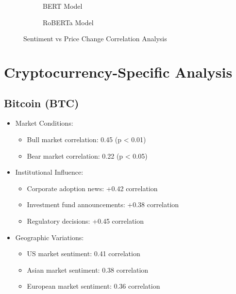 \documentclass[12pt,a4paper]{report}
\begin{document}
\begin{figure}[H]
    \centering
    \begin{subfigure}[b]{0.48\textwidth}
        
        \caption{BERT Model}
    \end{subfigure}
    \hfill
    \begin{subfigure}[b]{0.48\textwidth}
        
        \caption{RoBERTa Model}
    \end{subfigure}
    \caption{Sentiment vs Price Change Correlation Analysis}
\end{figure}

\section{Cryptocurrency-Specific Analysis}
\subsection{Bitcoin (BTC)}
\begin{itemize}
    \item Market Conditions:
        \begin{itemize}
            \item Bull market correlation: 0.45 (p < 0.01)
            \item Bear market correlation: 0.22 (p < 0.05)
        \end{itemize}
    \item Institutional Influence:
        \begin{itemize}
            \item Corporate adoption news: +0.42 correlation
            \item Investment fund announcements: +0.38 correlation
            \item Regulatory decisions: +0.45 correlation
        \end{itemize}
    \item Geographic Variations:
        \begin{itemize}
            \item US market sentiment: 0.41 correlation
            \item Asian market sentiment: 0.38 correlation
            \item European market sentiment: 0.36 correlation
        \end{itemize}
\end{itemize}
\end{document}
